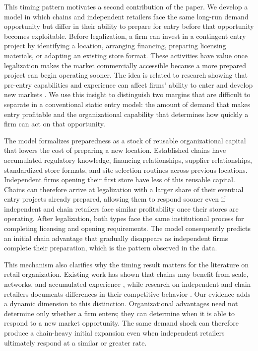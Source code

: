 \documentclass[english,12pt]{article}
\begin{document}
This timing pattern motivates a second contribution of the paper. We develop a model in which chains and independent retailers face the same long-run demand opportunity but differ in their ability to prepare for entry before that opportunity becomes exploitable. Before legalization, a firm can invest in a contingent entry project by identifying a location, arranging financing, preparing licensing materials, or adapting an existing store format. These activities have value once legalization makes the market commercially accessible because a more prepared project can begin operating sooner. The idea is related to research showing that pre-entry capabilities and experience can affect firms' ability to enter and develop new markets \citep{Lee2008,Moeen2017}. We use this insight to distinguish two margins that are difficult to separate in a conventional static entry model: the amount of demand that makes entry profitable and the organizational capability that determines how quickly a firm can act on that opportunity.

The model formalizes preparedness as a stock of reusable organizational capital that lowers the cost of preparing a new location. Established chains have accumulated regulatory knowledge, financing relationships, supplier relationships, standardized store formats, and site-selection routines across previous locations. Independent firms opening their first store have less of this reusable capital. Chains can therefore arrive at legalization with a larger share of their eventual entry projects already prepared, allowing them to respond sooner even if independent and chain retailers face similar profitability once their stores are operating. After legalization, both types face the same institutional process for completing licensing and opening requirements. The model consequently predicts an initial chain advantage that gradually disappears as independent firms complete their preparation, which is the pattern observed in the data.

This mechanism also clarifies why the timing result matters for the literature on retail organization. Existing work has shown that chains may benefit from scale, networks, and accumulated experience \citep{EllicksonHoughtonTimmins2013,HollenbeckGiroldo2022,Jia2008}, while research on independent and chain retailers documents differences in their competitive behavior \citep{AdamsEtAl2018,TalamasMarcos2025}. Our evidence adds a dynamic dimension to this distinction. Organizational advantages need not determine only whether a firm enters; they can determine when it is able to respond to a new market opportunity. The same demand shock can therefore produce a chain-heavy initial expansion even when independent retailers ultimately respond at a similar or greater rate.
\end{document}
